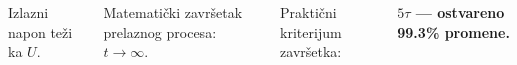 \begin{frame}[label=08-s049]
\begin{columns}[c,onlytextwidth]\centering
{}\gusttekst
Izlazni napon teži ka $U$.\par\medskip Matematički završetak prelaznog procesa: $t\to\infty$.\par\bigskip
Praktični kriterijum završetka:\par\medskip\textbf{\alert{$5\tau$} — ostvareno 99.3\% promene.}
\end{columns}
\end{frame}
